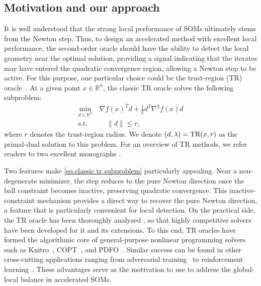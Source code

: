 \documentclass[moor,sglanonrev]{informs4}
\begin{document}
\subsection{Motivation and our approach}\label{sec.motivation}
It is well understood that the strong local performance of SOMs ultimately stems from the Newton step. Thus, to design an accelerated method with excellent local performance, the second-order oracle should have the ability to detect the local geometry near the optimal solution, providing a signal indicating that the iterates may have
entered the quadratic convergence region, allowing a Newton step to be active.
For this purpose, one particular choice could be the trust-region (TR) oracle~\cite{more1983recent,conn2000trust}. At a given point \( x \in \mathbb{R}^n \), the classic TR oracle solves the following subproblem:
\begin{equation}
    \label{eq.classic tr subproblem}
    \begin{aligned}
        \underset{d \in \mathbb{R}^n}{\min}~ & \nabla f(x)^T d + \tfrac{1}{2} d^T \nabla^2 f(x)  d \\
        \text{s.t.}                          & \quad  \|d\| \le r,
    \end{aligned}
\end{equation}
where \( r \) denotes the trust-region radius. We denote $(d,\lambda) = \textrm{TR}(x, r)$ as the primal-dual solution to this problem. For an overview of TR methods, we refer readers to two excellent monographs \cite{yuan2000review,yuan2015recent}.

Two features make \eqref{eq.classic tr subproblem} particularly appealing. Near a non-degenerate minimizer, the step reduces to the pure Newton direction once the ball constraint becomes inactive, preserving quadratic convergence. This inactive-constraint mechanism provides a direct way to recover the pure Newton direction, a feature that is particularly convenient for local detection.
On the practical side, the TR oracle has been thoroughly analyzed \cite{jiang2022holderian,rojas2001new,honguyen2017second,wang2022generalized,so2007on,so2011deterministic}, so that highly competitive solvers have been developed \cite{rojas2001new, adachi2017solving, adachi2019eigenvalue} for it and its extensions.
To this end, TR oracles have formed the algorithmic core of general-purpose nonlinear programming solvers such as Knitro~\cite{byrd2006knitro}, COPT~\cite{ge2022cardinal}, and PDFO~\cite{ragonneau2024pdfo}. Similar success can be found in other cross-cutting applications ranging from adversarial training~\cite{yao2019trust} to reinforcement learning~\cite{schulman2015trust}. These advantages serve as the motivation to use \tr{} to address the global-local balance in accelerated SOMs.
\end{document}

